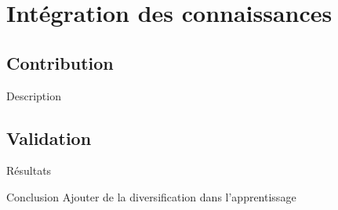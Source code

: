 \documentclass{beamer}
\begin{document}
\section{Intégration des connaissances}

\subsection{Contribution}
\begin{frame}{Description}

\end{frame}

\subsection{Validation}
\begin{frame}{Résultats}

\end{frame}

\begin{frame}{Conclusion}
Ajouter de la diversification dans l'apprentissage
\end{frame}
\end{document}
